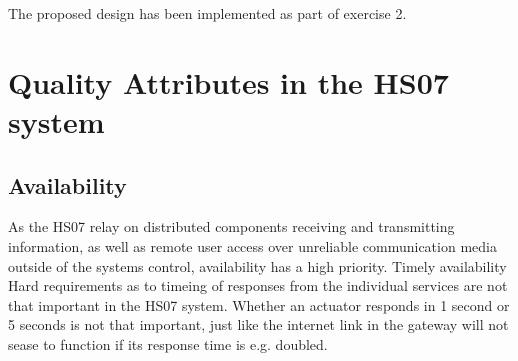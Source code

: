 \documentclass[a4paper,10pt]{article}
\begin{document}
The proposed design has been implemented as part of exercise 2.

%
%
%


\section{Quality Attributes in the HS07 system}
\subsection{Availability}
As the HS07 relay on distributed components receiving and transmitting information, as well as remote user access over unreliable communication media outside of the systems control, availability has a high priority.
Timely availability
Hard requirements as to timeing of responses from the individual services are not that important in the HS07 system. Whether an actuator responds in 1 second or 5 seconds is not that important, just like the internet link in the gateway will not sease to function if its response time is e.g. doubled.
\end{document}
